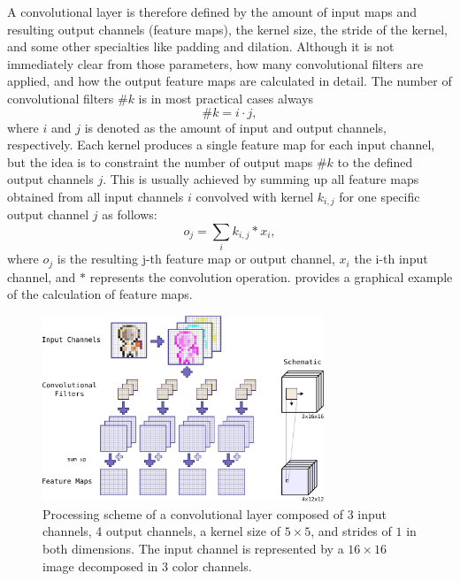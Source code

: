 A convolutional layer is therefore defined by the amount of input maps and resulting output channels (feature maps), the kernel size, the stride of the kernel, and some other specialties like padding and dilation.
Although it is not immediately clear from those parameters, how many convolutional filters are applied, and how the output feature maps are calculated in detail.
The number of convolutional filters $\#k$ is in most practical cases always
\begin{equation}\label{eq:nn_theory_n_filters}
  \#k = i \cdot j,
\end{equation}
where $i$ and $j$ is denoted as the amount of input and output channels, respectively.
Each kernel produces a single feature map for each input channel, but the idea is to constraint the number of output maps $\#k$ to the defined output channels $j$.
This is usually achieved by summing up all feature maps obtained from all input channels $i$ convolved with kernel $k_{i, j}$ for one specific output channel $j$ as follows:
\begin{equation}
  o_j = \sum_{i} k_{i, j} \ast x_i,
\end{equation}
where $o_j$ is the resulting j-th feature map or output channel, $x_i$ the i-th input channel, and $\ast$ represents the convolution operation.
 provides a graphical example of the calculation of feature maps.
\begin{figure}[!ht]
  \centering
    \includegraphics[width=0.75\textwidth]{./4_nn/figs/nn_theory_cnn_basics.pdf}
  \caption{Processing scheme of a convolutional layer composed of 3 input channels, 4 output channels, a kernel size of $5 \times 5$, and strides of $1$ in both dimensions. The input channel is represented by a $16 \times 16$ image decomposed in 3 color channels.}
  \label{fig:nn_theory_cnn_basics}
\end{figure}
\FloatBarrier
\noindent

